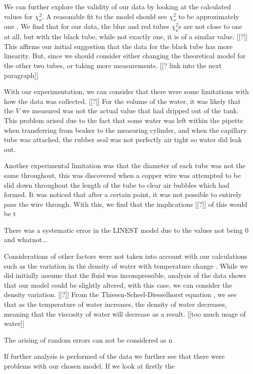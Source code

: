 \documentclass[twocolumn]{revtex4}
\begin{document}
We can further explore the validity of our data by looking at the calculated values for $\chi^2_{\nu}$. A reasonable fit to the model should see $\chi^2_{\nu}$ to be approximately one \cite{hughesandhayes}. We find that for our data, the blue and red tubes $\chi^2_{\nu}$s are not close to one at all, but with the black tube, while not exactly one, it is of a similar value. [[?]] This affirms our initial suggestion that the data for the black tube has more linearity. But, since  we should consider either changing the theoretical model for the other two tubes, or taking more measurements. [[? link into the next paragraph]]

With our experimentation, we can consider that there were some limitations with how the data was collected. [[?]] For the volume of the water, it was likely that the $V$ we measured was not the actual value that had dripped out of the tank. This problem arised due to the fact that some water was left within the pipette when transferring from beaker to the measuring cylinder, and when the capillary tube was attached, the rubber seal was not perfectly air tight so water did leak out.

Another experimental limitation was that the diameter of each tube was not the same throughout, this was discovered when a copper wire was attempted to be slid down throughout the length of the tube to clear air bubbles which had formed. It was noticed that after a certain point, it was not possible to entirely pass the wire through. With this, we find that the implications [[?]] of this would be t

There was a systematic error in the LINEST model due to the values not being 0 and whatnot... 

Considerations of other factors were not taken into account with our calculations such as the variation in the density of water with temperature change \cite{dentemp}. While we did initially assume that the fluid was incompressible, analysis of the data shows that our model could be slightly altered, with this case, we can consider the density variation. [[?]] From the Thiesen-Scheel-Diesselhorst equation \cite{dentemp}, we see that as the temperature of water increases, the density of water decreases, meaning that the viscosity of water will decrease as a result. [[too much usage of water]] 

The arising of random errors can not be considered as n

If further analysis is performed of the data we further see that there were problems with our chosen model. If we look at firstly the 
\end{document}
